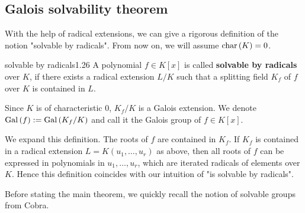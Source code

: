 \documentclass[twoside = false,	%
		headsepline,		%
		parskip = true,
		]{scrbook}						%
\begin{document}
    \subsection{Galois solvability theorem}
        With the help of radical extensions, we can give a rigorous definition of the notion "solvable by radicals". From now on, we will assume $\mathrm{char} \,(K)=0$.
        \begin{definition}{solvable by radicals}{1.26}
            A polynomial $f\in K[x]$ is called \textbf{solvable by radicals} over $K$, if there exists a radical extension $L/K$ such that a splitting field $K_f$ of $f$ over $K$ is contained in $L$.
            
            Since $K$ is of characteristic 0, $K_f/K$ is a Galois extension. We denote $\mathrm{Gal}\left( f\right):=\mathrm{Gal}\left( K_f/K\right)$ and call it the Galois group of $f\in K[x]$.
        \end{definition}
        We expand this definition. The roots of $f$ are contained in $K_f$. If $K_f$ is contained in  a radical extension $L=K(u_1,\dots,u_r)$ as above, then all roots of $f$ can be expressed in polynomials in $u_1,\dots,u_r$, which are iterated radicals of elements over $K$. Hence this definition coincides with our intuition of "is solvable by radicals".
        
        Before stating the main theorem, we quickly recall the notion of solvable groups from Cobra.
        
\end{document}
